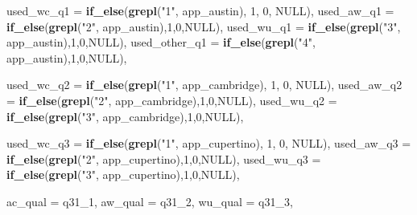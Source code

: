\documentclass[
  11pt,
]{article}
\newenvironment{Shaded}{\begin{snugshade}}{\end{snugshade}}
\newcommand{\AttributeTok}[1]{\textcolor[rgb]{0.13,0.29,0.53}{#1}}
\newcommand{\ConstantTok}[1]{\textcolor[rgb]{0.56,0.35,0.01}{#1}}
\newcommand{\DecValTok}[1]{\textcolor[rgb]{0.00,0.00,0.81}{#1}}
\newcommand{\FunctionTok}[1]{\textcolor[rgb]{0.13,0.29,0.53}{\textbf{#1}}}
\newcommand{\NormalTok}[1]{#1}
\newcommand{\StringTok}[1]{\textcolor[rgb]{0.31,0.60,0.02}{#1}}
\begin{document}
\begin{Shaded}
\begin{Highlighting}[]
         \AttributeTok{used\_wc\_q1 =} \FunctionTok{if\_else}\NormalTok{(}\FunctionTok{grepl}\NormalTok{(}\StringTok{"1"}\NormalTok{, app\_austin), }\DecValTok{1}\NormalTok{, }\DecValTok{0}\NormalTok{, }\ConstantTok{NULL}\NormalTok{),}
         \AttributeTok{used\_aw\_q1 =} \FunctionTok{if\_else}\NormalTok{(}\FunctionTok{grepl}\NormalTok{(}\StringTok{"2"}\NormalTok{, app\_austin),}\DecValTok{1}\NormalTok{,}\DecValTok{0}\NormalTok{,}\ConstantTok{NULL}\NormalTok{),}
         \AttributeTok{used\_wu\_q1 =} \FunctionTok{if\_else}\NormalTok{(}\FunctionTok{grepl}\NormalTok{(}\StringTok{"3"}\NormalTok{, app\_austin),}\DecValTok{1}\NormalTok{,}\DecValTok{0}\NormalTok{,}\ConstantTok{NULL}\NormalTok{),}
         \AttributeTok{used\_other\_q1 =} \FunctionTok{if\_else}\NormalTok{(}\FunctionTok{grepl}\NormalTok{(}\StringTok{"4"}\NormalTok{, app\_austin),}\DecValTok{1}\NormalTok{,}\DecValTok{0}\NormalTok{,}\ConstantTok{NULL}\NormalTok{),}
         
         \AttributeTok{used\_wc\_q2 =} \FunctionTok{if\_else}\NormalTok{(}\FunctionTok{grepl}\NormalTok{(}\StringTok{"1"}\NormalTok{, app\_cambridge), }\DecValTok{1}\NormalTok{, }\DecValTok{0}\NormalTok{, }\ConstantTok{NULL}\NormalTok{),}
         \AttributeTok{used\_aw\_q2 =} \FunctionTok{if\_else}\NormalTok{(}\FunctionTok{grepl}\NormalTok{(}\StringTok{"2"}\NormalTok{, app\_cambridge),}\DecValTok{1}\NormalTok{,}\DecValTok{0}\NormalTok{,}\ConstantTok{NULL}\NormalTok{),}
         \AttributeTok{used\_wu\_q2 =} \FunctionTok{if\_else}\NormalTok{(}\FunctionTok{grepl}\NormalTok{(}\StringTok{"3"}\NormalTok{, app\_cambridge),}\DecValTok{1}\NormalTok{,}\DecValTok{0}\NormalTok{,}\ConstantTok{NULL}\NormalTok{),}
         
         \AttributeTok{used\_wc\_q3 =} \FunctionTok{if\_else}\NormalTok{(}\FunctionTok{grepl}\NormalTok{(}\StringTok{"1"}\NormalTok{, app\_cupertino), }\DecValTok{1}\NormalTok{, }\DecValTok{0}\NormalTok{, }\ConstantTok{NULL}\NormalTok{),}
         \AttributeTok{used\_aw\_q3 =} \FunctionTok{if\_else}\NormalTok{(}\FunctionTok{grepl}\NormalTok{(}\StringTok{"2"}\NormalTok{, app\_cupertino),}\DecValTok{1}\NormalTok{,}\DecValTok{0}\NormalTok{,}\ConstantTok{NULL}\NormalTok{),}
         \AttributeTok{used\_wu\_q3 =} \FunctionTok{if\_else}\NormalTok{(}\FunctionTok{grepl}\NormalTok{(}\StringTok{"3"}\NormalTok{, app\_cupertino),}\DecValTok{1}\NormalTok{,}\DecValTok{0}\NormalTok{,}\ConstantTok{NULL}\NormalTok{),}

         \AttributeTok{ac\_qual =}\NormalTok{ q31\_1,}
         \AttributeTok{aw\_qual =}\NormalTok{ q31\_2,}
         \AttributeTok{wu\_qual =}\NormalTok{ q31\_3,}
         

\end{Highlighting}
\end{Shaded}
\end{document}
